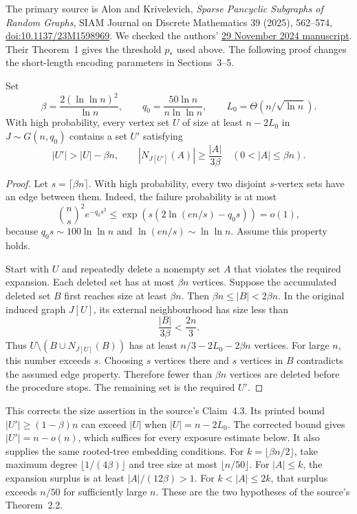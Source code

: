 The primary source is Alon and Krivelevich,
\emph{Sparse Pancyclic Subgraphs of Random Graphs},
SIAM Journal on Discrete Mathematics 39 (2025), 562--574,
\href{https://doi.org/10.1137/23M1598969}{doi:10.1137/23M1598969}.
We checked the authors' \href{https://www.math.tau.ac.il/~krivelev/pancyclic-rg.pdf}{29 November 2024 manuscript}.
Their Theorem~1 gives the threshold $p_*$ used above.
The following proof changes the short-length encoding parameters in Sections~3--5.

\begin{lemma}
\label{lem:rhost-expansion}
Set
\[
 \beta=\frac{2(\ln\ln n)^2}{\ln n},\qquad
 q_0=\frac{50\ln n}{n\ln\ln n},\qquad
 L_0=\Theta(n/\sqrt{\ln n}).
\]
With high probability, every vertex set $U$ of size at least $n-2L_0$ in $J\sim G(n,q_0)$ contains a set $U'$ satisfying
\[
 |U'|>|U|-\beta n,\qquad
 |N_{J[U']}(A)|\ge\frac{|A|}{3\beta}
 \quad(0<|A|\le\beta n).
\]
\end{lemma}

\begin{proof}
Let $s=\lceil\beta n\rceil$.
With high probability, every two disjoint $s$-vertex sets have an edge between them.
Indeed, the failure probability is at most
\[
 \binom ns^2e^{-q_0s^2}
 \le\exp\!\left(s\left(2\ln(en/s)-q_0s\right)\right)=o(1),
\]
because $q_0s\sim100\ln\ln n$ and $\ln(en/s)\sim\ln\ln n$.
Assume this property holds.

Start with $U$ and repeatedly delete a nonempty set $A$ that violates the required expansion.
Each deleted set has at most $\beta n$ vertices.
Suppose the accumulated deleted set $B$ first reaches size at least $\beta n$.
Then $\beta n\le|B|<2\beta n$.
In the original induced graph $J[U]$, its external neighbourhood has size less than
\[
 \frac{|B|}{3\beta}<\frac{2n}{3}.
\]
Thus $U\setminus(B\cup N_{J[U]}(B))$ has at least
$n/3-2L_0-2\beta n$ vertices.
For large $n$, this number exceeds $s$.
Choosing $s$ vertices there and $s$ vertices in $B$ contradicts the assumed edge property.
Therefore fewer than $\beta n$ vertices are deleted before the procedure stops.
The remaining set is the required $U'$.
\end{proof}

This corrects the size assertion in the source's Claim~4.3.
Its printed bound $|U'|\ge(1-\beta)n$ can exceed $|U|$ when $|U|=n-2L_0$.
The corrected bound gives $|U'|=n-o(n)$, which suffices for every exposure estimate below.
It also supplies the same rooted-tree embedding conditions.
For $k=\lfloor\beta n/2\rfloor$, take maximum degree $\lfloor1/(4\beta)\rfloor$ and tree size at most $\lfloor n/50\rfloor$.
For $|A|\le k$, the expansion surplus is at least $|A|/(12\beta)>1$.
For $k<|A|\le2k$, that surplus exceeds $n/50$ for sufficiently large $n$.
These are the two hypotheses of the source's Theorem~2.2.

